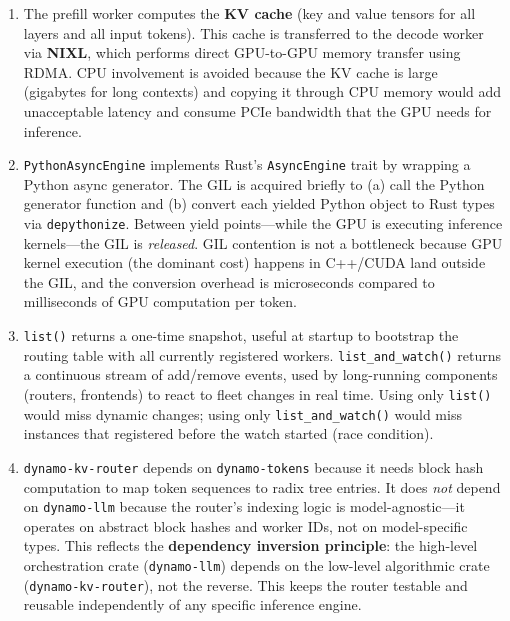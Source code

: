 \begin{enumerate}
  \item The prefill worker computes the \textbf{KV cache} (key and value tensors for all layers and all input tokens). This cache is transferred to the decode worker via \textbf{NIXL}, which performs direct GPU-to-GPU memory transfer using RDMA. CPU involvement is avoided because the KV cache is large (gigabytes for long contexts) and copying it through CPU memory would add unacceptable latency and consume PCIe bandwidth that the GPU needs for inference.

  \item \texttt{PythonAsyncEngine} implements Rust's \texttt{AsyncEngine} trait by wrapping a Python async generator. The GIL is acquired briefly to (a) call the Python generator function and (b) convert each yielded Python object to Rust types via \texttt{depythonize}. Between yield points---while the GPU is executing inference kernels---the GIL is \emph{released}. GIL contention is not a bottleneck because GPU kernel execution (the dominant cost) happens in C++/CUDA land outside the GIL, and the conversion overhead is microseconds compared to milliseconds of GPU computation per token.

  \item \texttt{list()} returns a one-time snapshot, useful at startup to bootstrap the routing table with all currently registered workers. \texttt{list\_and\_watch()} returns a continuous stream of add/remove events, used by long-running components (routers, frontends) to react to fleet changes in real time. Using only \texttt{list()} would miss dynamic changes; using only \texttt{list\_and\_watch()} would miss instances that registered before the watch started (race condition).

  \item \texttt{dynamo-kv-router} depends on \texttt{dynamo-tokens} because it needs block hash computation to map token sequences to radix tree entries. It does \emph{not} depend on \texttt{dynamo-llm} because the router's indexing logic is model-agnostic---it operates on abstract block hashes and worker IDs, not on model-specific types. This reflects the \textbf{dependency inversion principle}: the high-level orchestration crate (\texttt{dynamo-llm}) depends on the low-level algorithmic crate (\texttt{dynamo-kv-router}), not the reverse. This keeps the router testable and reusable independently of any specific inference engine.
\end{enumerate}
